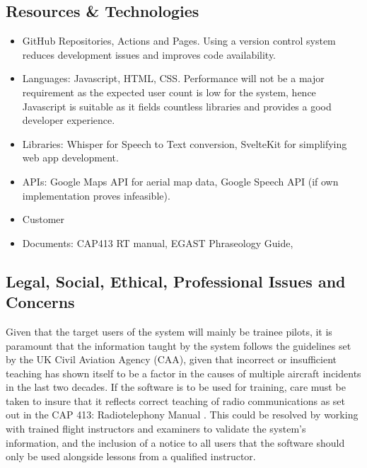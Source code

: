 \subsection{Resources \& Technologies}
\begin{itemize}
    \item GitHub Repositories, Actions and Pages. Using a version control system reduces development issues and improves code availability.
    \item Languages: Javascript, HTML, CSS. Performance will not be a major requirement as the expected user count is low for the system, hence Javascript is suitable as it fields countless libraries and provides a good developer experience.
    \item Libraries: Whisper for Speech to Text conversion, SvelteKit for simplifying web app development.
    \item APIs: Google Maps API for aerial map data, Google Speech API (if own implementation proves infeasible).
    \item Customer
    \item Documents: CAP413 RT manual, EGAST Phraseology Guide, 
\end{itemize}

\subsection{Legal, Social, Ethical, Professional Issues and Concerns}
Given that the target users of the system will mainly be trainee pilots, it is paramount that the information taught by the system follows the guidelines set by the UK Civil Aviation Agency (CAA), given that incorrect or insufficient teaching has shown itself to be a factor in the causes of multiple aircraft incidents in the last two decades. If the software is to be used for training, care must be taken to insure that it reflects correct teaching of radio communications as set out in the CAP 413: Radiotelephony Manual \cite{CAP413}. This could be resolved by working with trained flight instructors and examiners to validate the system's information, and the inclusion of a notice to all users that the software should only be used alongside lessons from a qualified instructor.